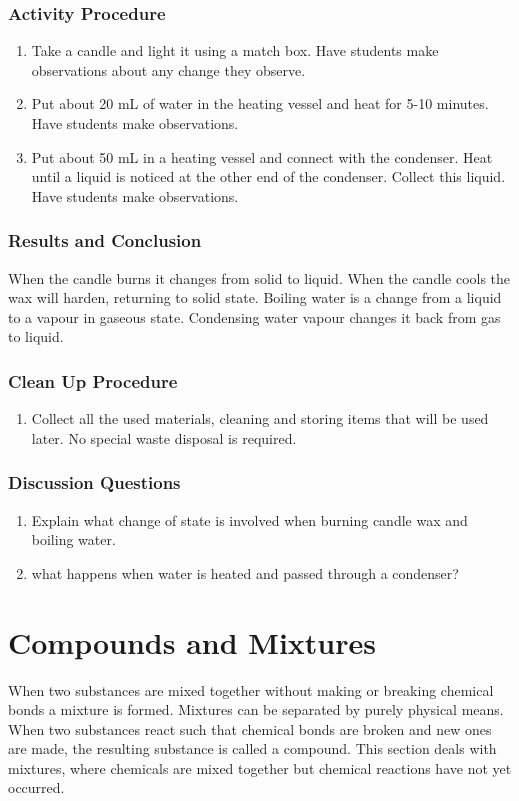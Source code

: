 \subsubsection*{Activity Procedure}
\begin{enumerate}
\item{Take a candle and light it using a match box. Have students make observations about any change they observe.}
\item{Put about 20 mL of water in the heating vessel and heat for 5-10 minutes. Have students make observations.}
\item{Put about 50 mL in a heating vessel and connect with the condenser. Heat until a liquid is noticed at the other end of the condenser. Collect this liquid. Have students make observations.}
\end{enumerate}

\subsubsection*{Results and Conclusion}
When the candle burns it changes from solid to liquid. When the candle cools the wax will harden, returning to solid state.
Boiling water is a change from a liquid to a vapour in gaseous state. Condensing water vapour changes it back from gas to liquid.

\subsubsection*{Clean Up Procedure}
\begin{enumerate}
\item{Collect all the used materials, cleaning and storing items that will be used later. No special waste disposal is required.}
\end{enumerate}

\subsubsection*{Discussion Questions}
\begin{enumerate}
\item{Explain what change of state is involved when burning candle wax and boiling water.}
\item{what happens when water is heated and passed through a condenser?}
\end{enumerate}

\section{Compounds and Mixtures}
When two substances are mixed together without making or breaking chemical bonds a mixture is formed. Mixtures can be separated by purely physical means. When two substances react such that chemical bonds are broken and new ones are made, the resulting substance is called a compound. This section deals with mixtures, where chemicals are mixed together but chemical reactions have not yet occurred.

